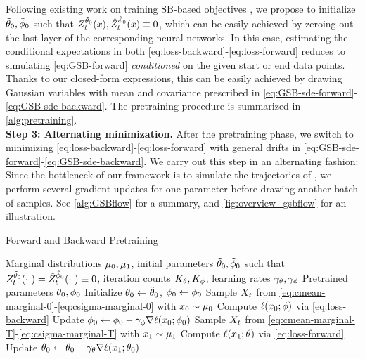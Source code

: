 Following existing work on training \acrshort{SB}-based objectives \citep{chen2021likelihood,de2021diffusion, vargas2021solving}, we propose to initialize $\tilde{\theta}_{0}, \tilde{\phi}_{0}$ such that $\SBf[\ctime][\point][\tilde{\paramf}_{0}], \SBb[\ctime][\point][\tilde{\paramb}_{0}] \equiv 0$, which can be easily achieved by zeroing out the last layer of the corresponding neural networks. In this case, estimating the conditional expectations in both \eqref{eq:loss-backward}-\eqref{eq:loss-forward} reduces to simulating \eqref{eq:GSB-forward} \emph{conditioned} on the given start or end data points. Thanks to our closed-form expressions, this can be easily achieved by drawing Gaussian variables with mean and covariance prescribed in  \eqref{eq:GSB-sde-forward}-\eqref{eq:GSB-sde-backward}. The pretraining procedure is summarized in \cref{alg:pretraining}. \\

\textbf{Step 3: Alternating minimization.} After the pretraining phase, we switch to minimizing \eqref{eq:loss-backward}-\eqref{eq:loss-forward} with general drifts in \eqref{eq:GSB-sde-forward}-\eqref{eq:GSB-sde-backward}. We carry out this step in an alternating fashion: Since the bottleneck of our framework is to simulate the trajectories of , we perform several gradient updates for one parameter before drawing another batch of samples. See \cref{alg:GSBflow} for a summary, and \cref{fig:overview_gsbflow} for an illustration.

\begin{algorithm}
   \caption{Forward and Backward Pretraining}
   \label{alg:pretraining}
\begin{algorithmic}
    Marginal distributions $\mu_0, \mu_1$, initial parameters $\tilde{\theta}_{0}, \tilde{\phi}_{0}$ such that $\SBf[\ctime][\cdot\ ][\tilde{\paramf}_0] = \SBb[\ctime][\cdot\ ][\tilde{\paramb}_0] \equiv 0$, iteration counts $K_{\theta}, K_{\phi}$, learning rates $\gamma_{\theta},\gamma_{\phi}$ %
    Pretrained parameters $\theta_0,\phi_0$
   \STATE Initialize $\theta_0 \leftarrow \tilde{\theta}_0$, $\phi_0 \leftarrow \tilde{\phi}_0$
   \STATE Sample $X_{ t }$ from \eqref{eq:cmean-marginal-0}-\eqref{eq:csigma-marginal-0} with $x_0 \sim \mu_0$
   \STATE Compute $\lossb$ via \eqref{eq:loss-backward}
   \STATE Update $\paramb_0 \subs \paramb_0 - \lrb\nabla \lossb[\point_0][\paramb_0]$
   \ENDFOR
   \STATE Sample $X_{ t }$ from \eqref{eq:cmean-marginal-T}-\eqref{eq:csigma-marginal-T} with $x_1 \sim \mu_1$
   \STATE Compute $\lossf$ via \eqref{eq:loss-forward}
   \STATE Update $\paramf_0 \subs \paramf_0 -\lrf \nabla \lossf[\point_\horizon][\paramf_0]$
   \ENDFOR
\end{algorithmic}
\end{algorithm}

